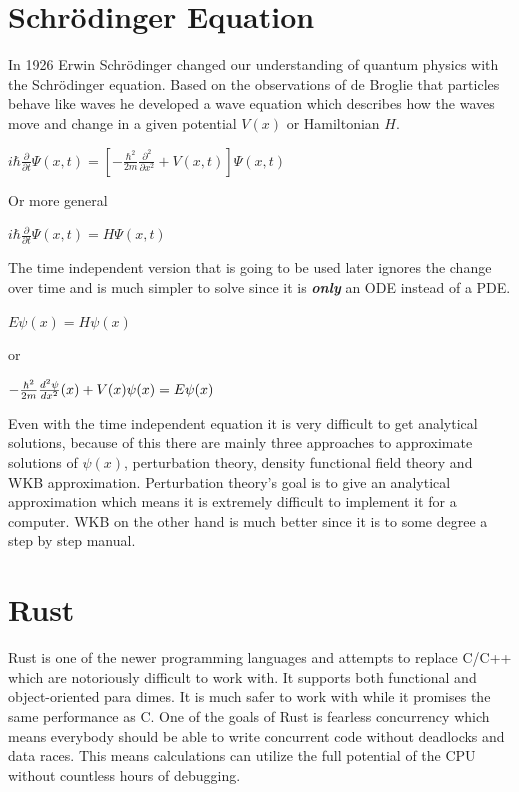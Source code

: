 \documentclass[11pt,DIV=10,final]{scrreprt} %
\begin{document}
\section{Schrödinger Equation}
In 1926 Erwin Schrödinger changed our understanding of quantum physics with the Schrödinger equation. Based on the observations of de Broglie that particles
behave like waves he developed a wave equation which describes how the waves move and change in a given potential $V(x)$ or Hamiltonian $H$.
\begin{center}
\begin{math}
  i\hbar {\frac {\partial }{\partial t}}\Psi (x,t)=\left[-{\frac {\hbar ^{2}}{2m}}{\frac {\partial ^{2}}{\partial x^{2}}}+V(x,t)\right]\Psi (x,t)
\end{math}
\end{center}
Or more general
\begin{center}
\begin{math}
  i\hbar {\frac {\partial }{\partial t}}\Psi (x,t)=H \Psi(x,t)
\end{math}
\end{center}

The time independent version that is going to be used later ignores the change over time and is much simpler to solve since it is \emph{\textbf{only}} an ODE instead of a PDE.
\begin{center}
\begin{math}
  E \psi (x)=H \psi(x)
\end{math}
\end{center}
or
\begin{center}
\begin{math}
  -{\hbar^{2} \over 2m}  {d^{2} \psi \over dx^{2}} (x) + V(x) \psi(x) = E \psi(x)
\end{math}
\end{center}

Even with the time independent equation it is very difficult to get analytical solutions, because of this there are mainly three approaches to
approximate solutions of $\psi(x)$, perturbation theory, density functional field theory and WKB approximation. Perturbation theory's goal is to give an analytical approximation which means it
is extremely difficult to implement it for a computer. WKB on the other hand is much better since it is to some degree a step by step manual.
\section{Rust}
Rust is one of the newer programming languages and attempts to replace C/C++ which are notoriously difficult to work with. It supports both functional and object-oriented para dimes. It is much safer to work with while it promises the same performance as C. One of the goals of Rust is fearless concurrency which means everybody should
be able to write concurrent code without deadlocks and data races. This means calculations can utilize the full potential of the CPU without countless hours of debugging.
\end{document}
